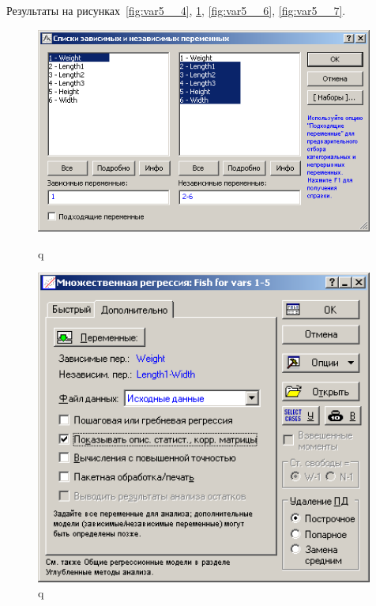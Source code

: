 Результаты на рисунках~\ref{fig:var5__4}, \ref{fig:var5__5}, \ref{fig:var5__6}, \ref{fig:var5__7}.

\begin{figure}[!h]
  \centering
  \begin{minipage}{0.49\textwidth}
    \centering

    \includegraphics[width=0.99\textwidth]
    {inc/var5__4.PNG}

    \caption{q}
    \label{fig:var5__4}
  \end{minipage}
  \begin{minipage}{0.49\textwidth}
    \centering

    \includegraphics[width=0.99\textwidth]
    {inc/var5__5.PNG}

    \caption{q}
    \label{fig:var5__5}
  \end{minipage}
\end{figure}

